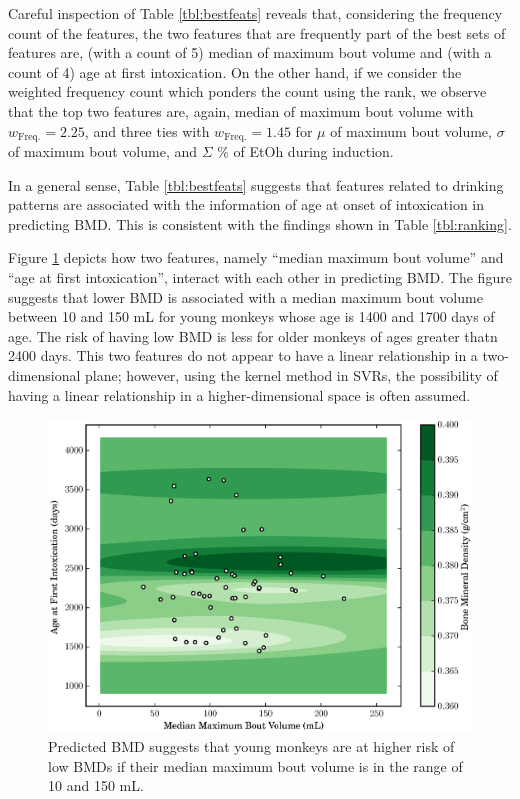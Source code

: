 \documentclass{bmcart}
\begin{document}
Careful inspection of Table \ref{tbl:bestfeats} reveals that, considering the
frequency count of the features, the two features that are frequently part of
the best sets of features are, (with a count of 5) median of maximum bout 
volume and (with a count of 4) age at
first intoxication. On the other hand, if we consider the weighted frequency
count which ponders the count using the rank, we observe that the top two
features are, again, median of maximum bout volume with $w_\text{Freq.}=2.25$,
and three ties with $w_\text{Freq.}=1.45$ for $\mu$ of maximum bout volume, 
$\sigma$ of maximum bout volume, and $\Sigma$ \% of EtOh during induction.

In a general sense, Table \ref{tbl:bestfeats} suggests that features 
related to drinking patterns are associated
with the information of age at onset of intoxication in predicting BMD.
This is consistent with the findings shown in Table \ref{tbl:ranking}.

Figure \ref{fig:maxb_age} depicts how two features, namely ``median maximum
bout volume'' and ``age at first intoxication'', interact with each other in
predicting BMD. The figure suggests that lower BMD is associated with a median
maximum bout volume between 10 and 150 mL for young monkeys whose age is 1400
and 1700 days of age. The risk of having low BMD is less for older monkeys of
ages greater thatn 2400 days. This two features do not appear to have a linear
relationship in a two-dimensional plane; however, using the kernel method in
SVRs, the possibility of having a linear relationship in a higher-dimensional space is
often assumed.

\begin{figure}[t]
    \caption{
Predicted BMD suggests that young monkeys are at higher risk of low BMDs if
their median maximum bout volume is in the range of 10 and 150 mL.}
\label{fig:maxb_age}
    \includegraphics[width=\textwidth]{mmbv_aafi.eps}
\end{figure}
\end{document}
